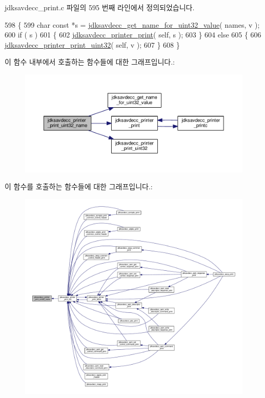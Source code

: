 jdksavdecc\+\_\+print.\+c 파일의 595 번째 라인에서 정의되었습니다.


\begin{DoxyCode}
598 \{
599     \textcolor{keywordtype}{char} \textcolor{keyword}{const} *s = \hyperlink{group__util_gaaabd45a243c0d81260bf2a761dc7f23c}{jdksavdecc\_get\_name\_for\_uint32\_value}( names, v );
600     \textcolor{keywordflow}{if} ( s )
601     \{
602         \hyperlink{group__util_ga335ac75e0aa3fe66501b752bf9d0f90d}{jdksavdecc\_printer\_print}( \textcolor{keyword}{self}, s );
603     \}
604     \textcolor{keywordflow}{else}
605     \{
606         \hyperlink{group__util_ga5ab4b0ba019ff6f6aa9d95d77560b294}{jdksavdecc\_printer\_print\_uint32}( \textcolor{keyword}{self}, v );
607     \}
608 \}
\end{DoxyCode}


이 함수 내부에서 호출하는 함수들에 대한 그래프입니다.\+:
\nopagebreak
\begin{figure}[H]
\begin{center}
\leavevmode
\includegraphics[width=350pt]{group__util_ga730a13ae4ddf17ddcd5f8ca399bd41ad_cgraph}
\end{center}
\end{figure}




이 함수를 호출하는 함수들에 대한 그래프입니다.\+:
\nopagebreak
\begin{figure}[H]
\begin{center}
\leavevmode
\includegraphics[width=350pt]{group__util_ga730a13ae4ddf17ddcd5f8ca399bd41ad_icgraph}
\end{center}
\end{figure}


